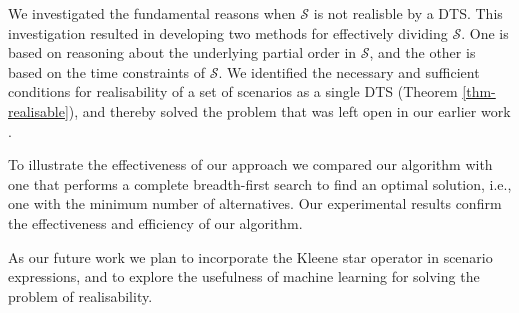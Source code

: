 We investigated the fundamental reasons when $\mathcal{S}$ is not
realisble by a DTS.
This investigation resulted in developing
two methods for effectively dividing $\mathcal{S}$.
One is based on reasoning about the underlying partial order in
$\mathcal{S}$, and the other is based on the time constraints of
$\mathcal{S}$.
We identified the necessary and sufficient conditions for realisability
of a set of scenarios as a single DTS (Theorem \ref{thm-realisable}),
and thereby solved the problem that was left open in our earlier
work \cite{DTS-2025}.

To illustrate the effectiveness of our approach
we compared our algorithm with one that performs a complete
breadth-first search to find
an optimal
solution, i.e., one with the minimum number of alternatives.
Our experimental results confirm the effectiveness and efficiency of
our algorithm.


As our future work we plan to incorporate the Kleene star
operator in scenario expressions, and to explore the usefulness of machine learning for
solving the problem of realisability.
